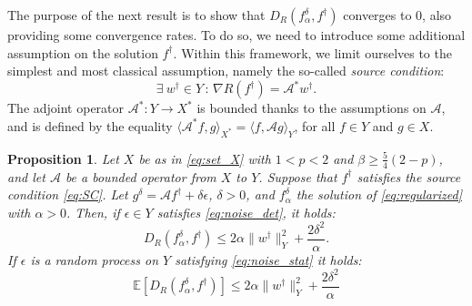 \documentclass[11pt,a4paper]{article}
\numberwithin{equation}{section}
\newtheorem{proposition}[theorem]{Proposition}
\newcommand{\cA}{\mathscr{A}}
\newcommand{\E}{\mathbb{E}}
\def\fda{f^\delta_{\alpha}}
\def\gd{{g}^{\delta}}
\begin{document}
The purpose of the next result is to show that $D_R(\fda,f^\dag)$ converges to $0$, also providing some convergence rates.
To do so, we need to introduce some additional assumption on the solution $f^\dag$. Within this framework, we limit ourselves to the simplest and most classical assumption, namely the so-called \textit{source condition}:
\begin{equation}
\exists \ w^\dag \in Y \, : \, \nabla R(f^\dag) = \cA^* w^\dag. 
    \label{eq:SC}
\end{equation}
The adjoint operator $\cA^*\colon Y \rightarrow X^*$ is bounded thanks to the assumptions on $\cA$, and is defined by the equality $\langle \cA^* f, g \rangle_{X^*} = \langle f, \cA g\rangle_Y$, for all $f \in Y$ and $g \in X$. 
\begin{proposition}
\label{prop:conv_rate_full}
Let $X$ be as in \eqref{eq:set_X} with $1<p<2$ and $\beta \geq \frac{5}{4}(2-p)$, and let $\cA$ be a bounded operator from $X$ to $Y$. Suppose that $f^\dag$ satisfies the source condition \eqref{eq:SC}. Let $\gd = \cA f^\dag + \delta \epsilon$, $\delta >0$, and $\fda$ the solution of \eqref{eq:regularized} with $\alpha > 0$. Then, if $\epsilon \in Y$ satisfies \eqref{eq:noise_det}, it holds:
\begin{equation}
D_R(\fda,f^\dag) \leq 2\alpha \| w^\dag\|_Y^2 + \frac{2\delta^2}{\alpha}.
    \label{eq:conv_rate_det}
\end{equation}
If $\epsilon$ is a random process on $Y$ satisfying \eqref{eq:noise_stat} it holds:
\begin{equation}
\E[D_R(\fda,f^\dag)] \leq 2\alpha \| w^\dag\|_Y^2 + \frac{2\delta^2}{\alpha}
    \label{eq:conv_rate_stat}
\end{equation}
\end{proposition}
\end{document}
